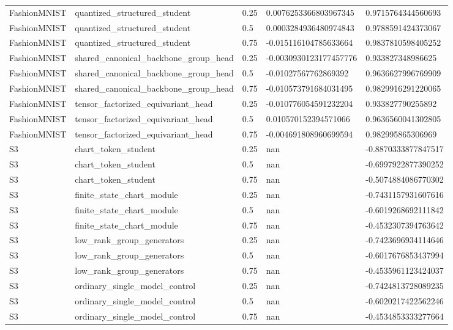 \begin{table}[t]
\begin{tabular}{lllll}
FashionMNIST & quantized\_structured\_student & 0.25 & 0.0076253366803967345 & 0.9715764344560693 \\
FashionMNIST & quantized\_structured\_student & 0.5 & 0.0003284936480974843 & 0.9788591424373067 \\
FashionMNIST & quantized\_structured\_student & 0.75 & -0.015116104785633664 & 0.9837810598405252 \\
FashionMNIST & shared\_canonical\_backbone\_group\_head & 0.25 & -0.0030930123177457776 & 0.933827348986625 \\
FashionMNIST & shared\_canonical\_backbone\_group\_head & 0.5 & -0.01027567762869392 & 0.9636627996769909 \\
FashionMNIST & shared\_canonical\_backbone\_group\_head & 0.75 & -0.010573791684031495 & 0.9829916291220065 \\
FashionMNIST & tensor\_factorized\_equivariant\_head & 0.25 & -0.010776054591232204 & 0.933827790255892 \\
FashionMNIST & tensor\_factorized\_equivariant\_head & 0.5 & 0.010570152394571066 & 0.9636560041302805 \\
FashionMNIST & tensor\_factorized\_equivariant\_head & 0.75 & -0.004691808960699594 & 0.982995865306969 \\
S3 & chart\_token\_student & 0.25 & nan & -0.8870333877847517 \\
S3 & chart\_token\_student & 0.5 & nan & -0.6997922877390252 \\
S3 & chart\_token\_student & 0.75 & nan & -0.5074884086770302 \\
S3 & finite\_state\_chart\_module & 0.25 & nan & -0.7431157931607616 \\
S3 & finite\_state\_chart\_module & 0.5 & nan & -0.6019268692111842 \\
S3 & finite\_state\_chart\_module & 0.75 & nan & -0.4532307394763642 \\
S3 & low\_rank\_group\_generators & 0.25 & nan & -0.7423696934114646 \\
S3 & low\_rank\_group\_generators & 0.5 & nan & -0.6017676853437994 \\
S3 & low\_rank\_group\_generators & 0.75 & nan & -0.4535961123424037 \\
S3 & ordinary\_single\_model\_control & 0.25 & nan & -0.7424813728089235 \\
S3 & ordinary\_single\_model\_control & 0.5 & nan & -0.6020217422562246 \\
S3 & ordinary\_single\_model\_control & 0.75 & nan & -0.4534853333277664 \\

\end{tabular}
\end{table}
